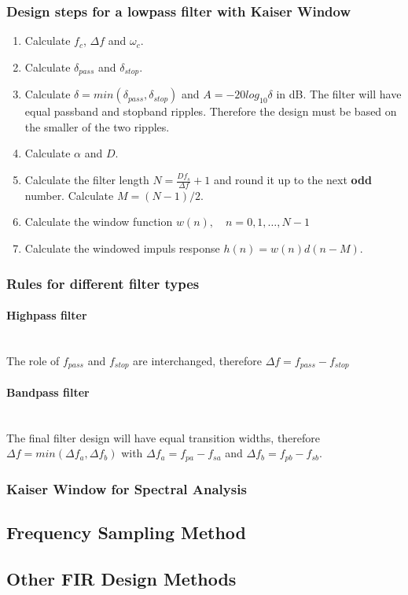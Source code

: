 \subsubsection{Design steps for a lowpass filter with Kaiser Window}
\begin{enumerate}
\item Calculate $f_c$, $\Delta f$ and $\omega_c$.
\item Calculate $\delta_{pass}$ and $\delta_{stop}$.
\item Calculate $\delta=min(\delta_{pass},\delta_{stop})$ and $A=-20log_{10}\delta$ in dB. \newline
	  The filter will have equal passband and stopband ripples. Therefore the design must be based on the smaller of the two ripples.
\item Calculate $\alpha$ and $D$.
\item Calculate the filter length $N=\frac{Df_s}{\Delta f}+1$ and round it up to the next \textbf{odd} number. Calculate $M=(N-1)/2$.
\item Calculate the window function $w(n),\quad n=0,1,\dots,N-1$
\item Calculate the windowed impuls response $h(n)=w(n)d(n-M)$.
\end{enumerate}

\subsubsection{Rules for different filter types}
\paragraph{Highpass filter}~\\
The role of $f_{pass}$ and $f_{stop}$ are interchanged, therefore $\Delta f = f_{pass}-f_{stop}$
\paragraph{Bandpass filter}~\\
The final filter design will have equal transition widths, therefore $\Delta f = min(\Delta f_a, \Delta f_b)$ with $\Delta f_a=f_{pa}-f_{sa}$ and $\Delta f_b=f_{pb}-f_{sb}$.

\subsubsection{Kaiser Window for Spectral Analysis}

\subsection{Frequency Sampling Method}

\subsection{Other FIR Design Methods}

